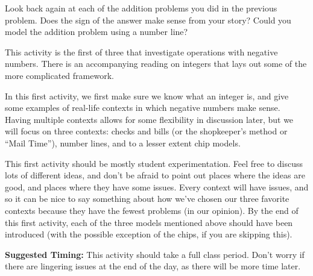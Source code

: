 \documentclass{ximera}
\begin{document}
\begin{problem}
Look back again at each of the addition problems you did in the previous problem.  Does the sign of the answer make sense from your story?  Could you model the addition problem using a number line?

\end{problem}


\newpage
\begin{instructorNotes}
This activity is the first of three that investigate operations with negative numbers.  There is an accompanying reading on integers that lays out some of the more complicated framework.

In this first activity, we first make sure we know what an integer is, and give some examples of real-life contexts in which negative numbers make sense.  Having multiple contexts allows for some flexibility in discussion later, but we will focus on three contexts: checks and bills (or the shopkeeper's method or ``Mail Time''), number lines, and to a lesser extent chip models.

This first activity should be mostly student experimentation.  Feel free to discuss lots of different ideas, and don't be afraid to point out places where the ideas are good, and places where they have some issues.  Every context will have issues, and so it can be nice to say something about how we've chosen our three favorite contexts because they have the fewest problems (in our opinion).  By the end of this first activity, each of the three models mentioned above should have been introduced (with the possible exception of the chips, if you are skipping this).

{\bf Suggested Timing:} This activity should take a full class period.  Don't worry if there are lingering issues at the end of the day, as there will be more time later.
\end{instructorNotes}


\end{document}
